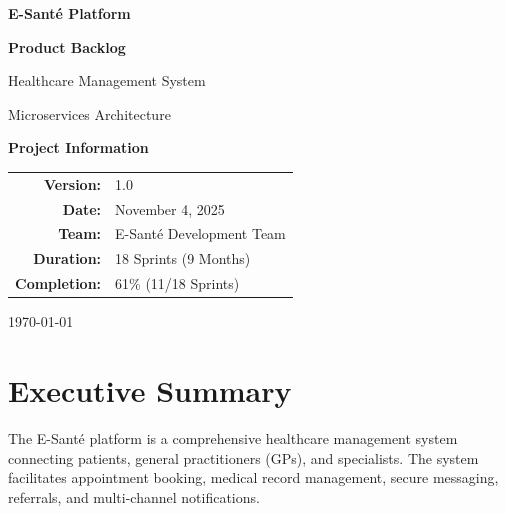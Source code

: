 \documentclass[11pt,a4paper]{article}
\begin{document}
\begin{titlepage}
    \centering
    \vspace*{2cm}
    
    {\Huge\bfseries\color{primaryblue} E-Santé Platform\par}
    \vspace{1cm}
    {\LARGE\bfseries Product Backlog\par}
    \vspace{2cm}
    
    {\Large Healthcare Management System\par}
    \vspace{0.5cm}
    {\large Microservices Architecture\par}
    
    \vfill
    
    \begin{tcolorbox}[colback=lightgray,colframe=primaryblue,width=12cm]
        \centering
        \textbf{Project Information}\\[0.5cm]
        \begin{tabular}{rl}
            \textbf{Version:} & 1.0\\
            \textbf{Date:} & November 4, 2025\\
            \textbf{Team:} & E-Santé Development Team\\
            \textbf{Duration:} & 18 Sprints (9 Months)\\
            \textbf{Completion:} & 61\% (11/18 Sprints)\\
        \end{tabular}
    \end{tcolorbox}
    
    \vfill
    
    {\large \today\par}
\end{titlepage}

\tableofcontents
\newpage

\section{Executive Summary}

The E-Santé platform is a comprehensive healthcare management system connecting patients, general practitioners (GPs), and specialists. The system facilitates appointment booking, medical record management, secure messaging, referrals, and multi-channel notifications.
\end{document}
